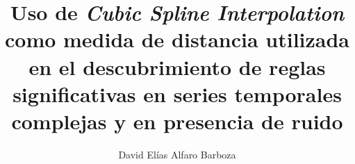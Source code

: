 \title{Uso de \textit{Cubic Spline Interpolation} como medida de distancia utilizada en el descubrimiento de reglas significativas en series temporales complejas y en presencia de ruido}
\author{David El\'ias Alfaro Barboza}
\maketitle
\cleardoublepage
\setcounter{savepage}{\thepage}
\begin{abstractpage}

\end{abstractpage}
